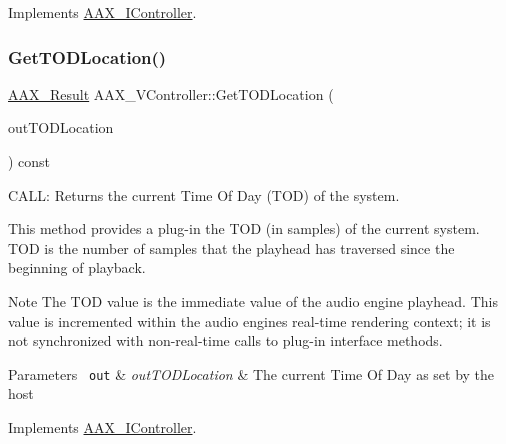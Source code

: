 Implements \mbox{\hyperlink{a01789_a26e009667f9cd6c3cccd45b862108bf4}{A\+A\+X\+\_\+\+I\+Controller}}.

\mbox{\label{a01905_a9ae44bc7589edb872e8194099b575afd}} 
\subsubsection{\texorpdfstring{GetTODLocation()}{GetTODLocation()}}
{\footnotesize\ttfamily \mbox{\hyperlink{a00392_a4d8f69a697df7f70c3a8e9b8ee130d2f}{A\+A\+X\+\_\+\+Result}} A\+A\+X\+\_\+\+V\+Controller\+::\+Get\+T\+O\+D\+Location (\begin{DoxyParamCaption}\item[{\mbox{\hyperlink{a00392_a46542a1dcccdcc3b4260a9926edf8a2a}{A\+A\+X\+\_\+\+C\+Time\+Of\+Day}} $\ast$}]{out\+T\+O\+D\+Location }\end{DoxyParamCaption}) const\hspace{0.3cm}{\ttfamily [virtual]}}



C\+A\+LL\+: Returns the current Time Of Day (T\+OD) of the system. 

This method provides a plug-\/in the T\+OD (in samples) of the current system. T\+OD is the number of samples that the playhead has traversed since the beginning of playback.

\begin{DoxyNote}{Note}
The T\+OD value is the immediate value of the audio engine playhead. This value is incremented within the audio engine\textquotesingle{}s real-\/time rendering context; it is not synchronized with non-\/real-\/time calls to plug-\/in interface methods.
\end{DoxyNote}

\begin{DoxyParams}[1]{Parameters}
\mbox{\texttt{ out}}  & {\em out\+T\+O\+D\+Location} & The current Time Of Day as set by the host \\
\hline
\end{DoxyParams}


Implements \mbox{\hyperlink{a01789_afbc2973d755b6c3ae82b6c8461e9fdee}{A\+A\+X\+\_\+\+I\+Controller}}.

\mbox{\label{a01905_affb116c9d90b03aa974ad238d4690e22}} 
